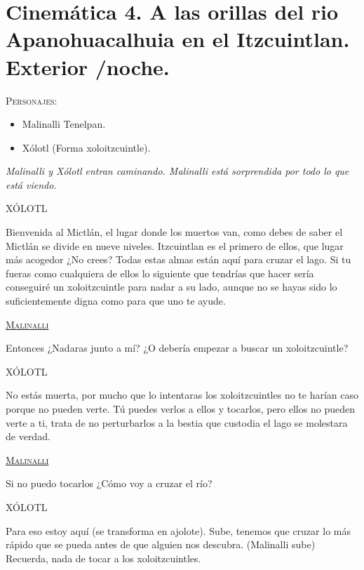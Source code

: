\section{Cinemática 4. A las orillas del rio Apanohuacalhuia en el Itzcuintlan. Exterior /noche.}
\label{Cin:Cinematica04}
 \textsc{Personajes}:
\begin{itemize}
	\item Malinalli Tenelpan.
	\item Xólotl (Forma xoloitzcuintle).
\end{itemize}
\textit{Malinalli y Xólotl entran caminando. Malinalli está sorprendida por todo lo que está viendo.}

\begin{center}
XÓLOTL
\\
\par
Bienvenida al Mictlán, el lugar donde los muertos van, como debes de saber el Mictlán se divide en nueve niveles. Itzcuintlan es el primero de ellos, que lugar más acogedor ¿No crees? Todas estas almas están aquí para cruzar el lago. Si tu fueras como cualquiera de ellos lo siguiente que tendrías que hacer sería conseguiré un xoloitzcuintle para nadar a su lado, aunque no se hayas sido lo suficientemente digna como para que uno te ayude.
\\
\par
\textsc{\underline{Malinalli}}
\\
\par
Entonces ¿Nadaras junto a mí? ¿O debería empezar a buscar un xoloitzcuintle?
\\
\par
XÓLOTL
\\
\par
No estás muerta, por mucho que lo intentaras los xoloitzcuintles no te harían caso porque no pueden verte. Tú puedes verlos a ellos y tocarlos, pero ellos no pueden verte a ti, trata de no perturbarlos a la bestia que custodia el lago se molestara de verdad.
\\
\par
\textsc{\underline{Malinalli}}
\\
\par
Si no puedo tocarlos ¿Cómo voy a cruzar el río?
\\
\par
XÓLOTL
\\
\par
Para eso estoy aquí (se transforma en ajolote). Sube, tenemos que cruzar lo más rápido que se pueda antes de que alguien nos descubra. (Malinalli sube) Recuerda, nada de tocar a los xoloitzcuintles.
\end{center}
